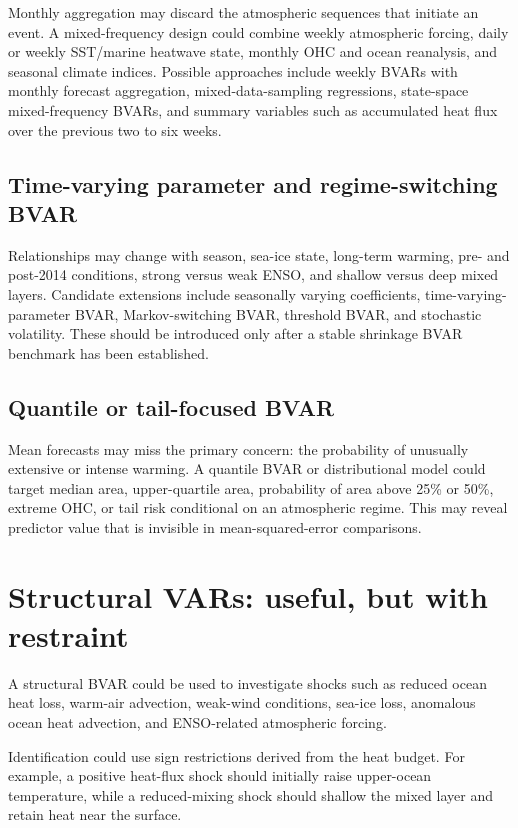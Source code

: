 \documentclass[11pt]{article}
\newcommand{\MHW}{marine heatwave}
\begin{document}
Monthly aggregation may discard the atmospheric sequences that initiate an event. A mixed-frequency design could combine weekly atmospheric forcing, daily or weekly SST/\MHW{} state, monthly OHC and ocean reanalysis, and seasonal climate indices. Possible approaches include weekly BVARs with monthly forecast aggregation, mixed-data-sampling regressions, state-space mixed-frequency BVARs, and summary variables such as accumulated heat flux over the previous two to six weeks.

\subsection{Time-varying parameter and regime-switching BVAR}

Relationships may change with season, sea-ice state, long-term warming, pre- and post-2014 conditions, strong versus weak ENSO, and shallow versus deep mixed layers. Candidate extensions include seasonally varying coefficients, time-varying-parameter BVAR, Markov-switching BVAR, threshold BVAR, and stochastic volatility. These should be introduced only after a stable shrinkage BVAR benchmark has been established.

\subsection{Quantile or tail-focused BVAR}

Mean forecasts may miss the primary concern: the probability of unusually extensive or intense warming. A quantile BVAR or distributional model could target median area, upper-quartile area, probability of area above 25\% or 50\%, extreme OHC, or tail risk conditional on an atmospheric regime. This may reveal predictor value that is invisible in mean-squared-error comparisons.

\section{Structural VARs: useful, but with restraint}

A structural BVAR could be used to investigate shocks such as reduced ocean heat loss, warm-air advection, weak-wind conditions, sea-ice loss, anomalous ocean heat advection, and ENSO-related atmospheric forcing.

Identification could use sign restrictions derived from the heat budget. For example, a positive heat-flux shock should initially raise upper-ocean temperature, while a reduced-mixing shock should shallow the mixed layer and retain heat near the surface.
\end{document}
